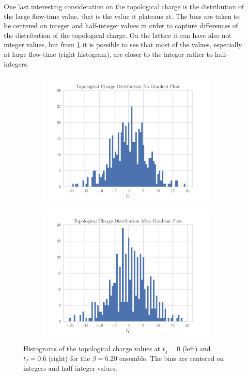 One last interesting consideration on the topological charge is the distribution of the large flow-time value, that is the value it plateaus at. The bins are taken to be centered on integer and half-integer values in order to capture differences of the distribution of the topological charge. On the lattice it can have also not integer values, but from \cref{fig:topchist} it is possible to see that most of the values, especially at large flow-time (right histogram), are closer to the integer rather to half-integers.
\begin{figure}[hbt!]
    \centering
    \begin{subfigure}{0.45\textwidth}
        \includegraphics[width=\textwidth]{results/TopcHistNoFlow.pdf}
    \end{subfigure}
    \begin{subfigure}{0.45\textwidth}
        \includegraphics[width=\textwidth]{results/TopcHistFlow.pdf}
    \end{subfigure}
    \caption{\footnotesize Histograms of the topological charge values at $t_f=0$ (left) and $t_f=0.6$ (right) for the $\beta=6.20$ ensemble. The bins are centered on integers and half-integer values.}
    \label{fig:topchist}
\end{figure} 


